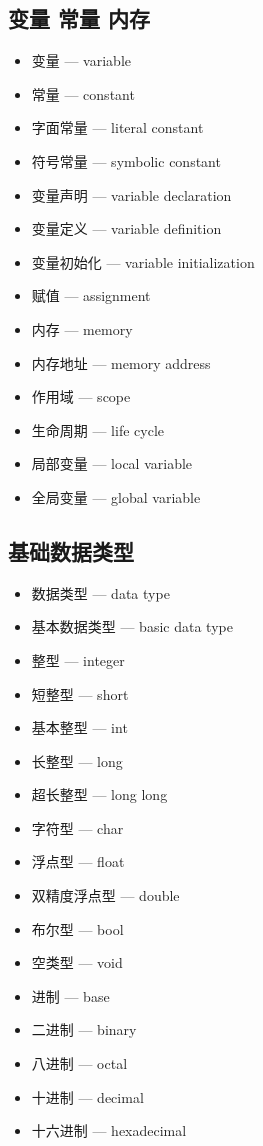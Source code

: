 \subsection{变量 常量 内存}
\begin{itemize}
\item 变量 — variable
\item 常量 — constant
\item 字面常量 — literal constant
\item 符号常量 — symbolic constant
\item 变量声明 — variable declaration
\item 变量定义 — variable definition
\item 变量初始化 — variable initialization
\item 赋值 — assignment
\item 内存 — memory
\item 内存地址 — memory address
\item 作用域 — scope
\item 生命周期 — life cycle
\item 局部变量 — local variable
\item 全局变量 — global variable
\end{itemize}

\subsection{基础数据类型}
\begin{itemize}
\item 数据类型 — data type
\item 基本数据类型 — basic data type
\item 整型 — integer
\item 短整型 — short
\item 基本整型 — int
\item 长整型 — long
\item 超长整型 — long long
\item 字符型 — char
\item 浮点型 — float
\item 双精度浮点型 — double
\item 布尔型 — bool
\item 空类型 — void
\item 进制 — base
\item 二进制 — binary
\item 八进制 — octal
\item 十进制 — decimal
\item 十六进制 — hexadecimal
\end{itemize}

